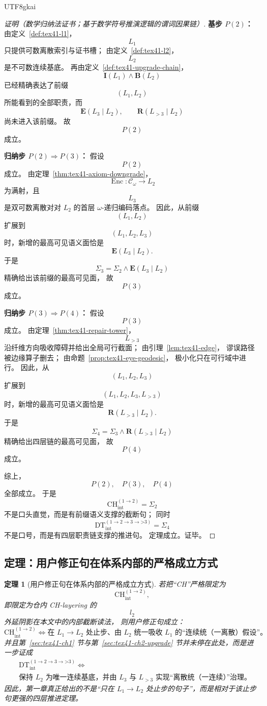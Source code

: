 \documentclass[12pt]{article}
\newtheorem{theorem}{定理}[section]
\newcommand{\CodeSpace}{\mathcal{C}_\omega}
\newcommand{\Enc}{\operatorname{Enc}}
\newcommand{\CHint}{\mathrm{CH}_{\mathrm{int}}}
\newcommand{\DTint}{\mathrm{DT}_{\mathrm{int}}}
\begin{document}
\begin{CJK*}{UTF8}{gkai}
\begin{proof}[证明（数学归纳法证书；基于数学符号推演逻辑的谓词因果链）]
\textbf{基步 $P(2)$：}
由定义~\ref{def:tex41-l1}，
\[
  L_1
\]
只提供可数离散索引与证书槽；
由定义~\ref{def:tex41-l2}，
\[
  L_2
\]
是不可数连续基底。
再由定义~\ref{def:tex41-upgrade-chain}，
\[
  \mathbf I(L_1)\wedge \mathbf B(L_2)
\]
已经精确表达了前缀
\[
  (L_1,L_2)
\]
所能看到的全部职责，而
\[
  \mathbf E(L_3\mid L_2),\qquad
  \mathbf R(L_{>3}\mid L_2)
\]
尚未进入该前缀。
故
\[
  P(2)
\]
成立。

\textbf{归纳步 $P(2)\Rightarrow P(3)$：}
假设
\[
  P(2)
\]
成立。
由定理~\ref{thm:tex41-axiom-downgrade}，
\[
  \Enc:\CodeSpace\to L_2
\]
为满射，且
\[
  L_3
\]
是双可数离散对对 $L_2$ 的首层 $\omega$-递归编码落点。
因此，从前缀
\[
  (L_1,L_2)
\]
扩展到
\[
  (L_1,L_2,L_3)
\]
时，新增的最高可见语义面恰是
\[
  \mathbf E(L_3\mid L_2).
\]
于是
\[
  \Sigma_3
  =
  \Sigma_2\wedge \mathbf E(L_3\mid L_2)
\]
精确给出该前缀的最高可见面，
故
\[
  P(3)
\]
成立。

\textbf{归纳步 $P(3)\Rightarrow P(4)$：}
假设
\[
  P(3)
\]
成立。
由定理~\ref{thm:tex41-repair-tower}，
\[
  L_{>3}
\]
沿纤维方向吸收障碍并给出全局可行截面；
由引理~\ref{lem:tex41-edge}，
谬误路径被边缘算子删去；
由命题~\ref{prop:tex41-eye-geodesic}，
极小化只在可行域中进行。
因此，从
\[
  (L_1,L_2,L_3)
\]
扩展到
\[
  (L_1,L_2,L_3,L_{>3})
\]
时，新增的最高可见语义面恰是
\[
  \mathbf R(L_{>3}\mid L_2).
\]
于是
\[
  \Sigma_4
  =
  \Sigma_3\wedge \mathbf R(L_{>3}\mid L_2)
\]
精确给出四层链的最高可见面，
故
\[
  P(4)
\]
成立。

综上，
\[
  P(2),\quad P(3),\quad P(4)
\]
全部成立。
于是
\[
  \CHint^{(1\to2)}=\Sigma_2
\]
不是口头直觉，而是有前缀语义支撑的截断句；
同时
\[
  \DTint^{(1\to2\to3\to\text{>3})}=\Sigma_4
\]
不是口号，而是有四层职责链支撑的推进句。
定理成立。证毕。
\end{proof}

\subsection{定理：用户修正句在体系内部的严格成立方式}
\label{subsec:tex41-ch-confirmation-theorem}

\begin{theorem}[用户修正句在体系内部的严格成立方式]
\label{thm:tex41-ch-confirmation-main}
若把“CH”严格限定为
\[
  \CHint^{(1\to2)},
\]
即限定为仓内 CH-layering 的
\[
  l_2
\]
外延阴影在本文中的内部截断读法，
则用户修正句成立：
\[
\boxed{
  \CHint^{(1\to2)}
  \Longleftrightarrow
  \text{在 }L_1\to L_2\text{ 处止步、由 }L_2\text{ 统一吸收 }L_1\text{ 的“连续统（一离散）假设”。}
}
\]
并且第~\ref{sec:tex41-ch1} 节与第~\ref{sec:tex41-ch2-upgrade} 节并未停在此处，而是进一步证成
\[
\boxed{
  \begin{aligned}
    &\DTint^{(1\to2\to3\to\text{>3})}
    \Longleftrightarrow\\
    &\text{保持 }L_2\text{ 为唯一连续基底，并由 }L_3\text{ 与 }L_{>3}\text{ 实现“离散统（一连续）”治理。}
  \end{aligned}
}
\]
因此，第一章真正给出的不是“只在 $L_1\to L_2$ 处止步的句子”，而是相对于该止步句更强的四层推进定理。
\end{theorem}


\end{CJK*}
\end{document}
